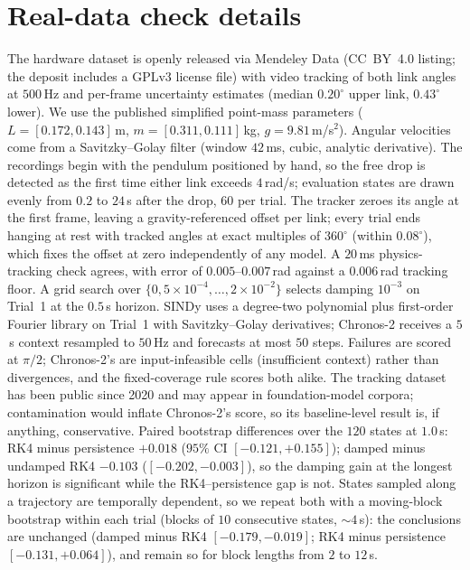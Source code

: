 \documentclass{article}
\begin{document}
\section{Real-data check details}
\label{app:realdata}
The hardware dataset \citep{myers2020pendulum} is openly released via Mendeley Data
(CC~BY~4.0 listing; the deposit includes a GPLv3 license file) with video tracking of
both link angles at $500$\,Hz and per-frame uncertainty estimates (median $0.20^{\circ}$ upper
link, $0.43^{\circ}$ lower). We use the published simplified point-mass parameters
($L=[0.172,0.143]$\,m, $m=[0.311,0.111]$\,kg, $g=9.81$\,m/s$^2$). Angular velocities come from a
Savitzky--Golay filter (window $42$\,ms, cubic, analytic derivative). The recordings begin
with the pendulum positioned by hand, so the free drop is detected as the first time either
link exceeds $4$\,rad/s; evaluation states are drawn evenly from $0.2$ to $24$\,s after the
drop, $60$ per trial. The tracker zeroes its angle at the first frame, leaving a
gravity-referenced offset per link; every trial ends hanging at rest with tracked angles at
exact multiples of $360^{\circ}$ (within $0.08^{\circ}$), which fixes the offset at zero
independently of any model. A $20$\,ms physics-tracking check agrees, with error of
$0.005$--$0.007$\,rad against a $0.006$\,rad tracking floor. A grid search over
$\{0,5{\times}10^{-4},\dots,2{\times}10^{-2}\}$ selects damping $10^{-3}$ on Trial~1 at the $0.5$\,s
horizon. SINDy uses a degree-two polynomial plus first-order Fourier library on Trial~1 with
Savitzky--Golay derivatives; Chronos-2 receives a $5$\,s context resampled to $50$\,Hz and
forecasts at most $50$ steps. Failures are scored at $\pi/2$; Chronos-2's are input-infeasible cells (insufficient
context) rather than divergences, and the fixed-coverage rule scores both alike. The tracking
dataset has been public since 2020 and may appear in foundation-model corpora; contamination
would inflate Chronos-2's score, so its baseline-level result is, if anything, conservative. Paired
bootstrap differences over the $120$ states at $1.0$\,s: RK4 minus persistence $+0.018$
($95\%$ CI $[-0.121,+0.155]$); damped minus undamped RK4 $-0.103$ ($[-0.202,-0.003]$), so
the damping gain at the longest horizon is significant while the RK4--persistence gap is
not. States sampled along a trajectory are temporally dependent, so we repeat both with a
moving-block bootstrap within each trial (blocks of $10$ consecutive states, ${\sim}4$\,s):
the conclusions are unchanged (damped minus RK4 $[-0.179,-0.019]$; RK4 minus persistence
$[-0.131,+0.064]$), and remain so for block lengths from $2$ to $12$\,s.
\end{document}
